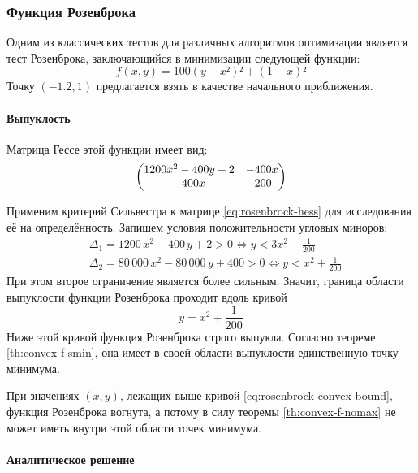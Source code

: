 \subsubsection{Функция Розенброка}

Одним из классических тестов для различных алгоритмов оптимизации
является тест Розенброка, заключающийся в минимизации следующей
функции:
\begin{equation}
  \label{eq:rosenbrock}
  \tag{$\rho$-\theequation}
  f(x, y) = 100(y - x²)² + (1 - x)²
\end{equation}
Точку $(-1.2, 1)$ предлагается взять в качестве начального
приближения.

\paragraph{Выпуклость}

Матрица Гессе этой функции имеет вид:
\begin{equation}
  \label{eq:rosenbrock-hess}
  \begin{pmatrix}
    1200x^2-400y+2 & -400x \\
    -400x & \phm200\phantom{x}
  \end{pmatrix}
\end{equation}

Применим критерий Сильвестра к матрице \eqref{eq:rosenbrock-hess} для
исследования её на определённость. Запишем условия положительности
угловых миноров:
\begin{align*}
  &\Delta_1 = 1200\,x^2-400\,y+2 > 0 \iff y < 3x^2+\frac{1}{200}\\
  &\Delta_2 = 80\,000\,x^2-80\,000\,y+400 > 0 \iff y < x^2+\frac{1}{200}
\end{align*}
При этом второе ограничение является более сильным. Значит, граница
области выпуклости функции Розенброка проходит вдоль кривой
\begin{equation}
  \label{eq:rosenbrock-convex-bound}
  y = x^2 +\frac{1}{200}
\end{equation}
Ниже этой кривой функция Розенброка строго выпукла. Согласно теореме
\ref{th:convex-f-smin}, она имеет в своей области выпуклости
единственную точку минимума.

При значениях $(x, y)$, лежащих выше кривой
\eqref{eq:rosenbrock-convex-bound}, функция Розенброка вогнута, а
потому в силу теоремы \ref{th:convex-f-nomax} не может иметь внутри
этой области точек минимума.

\paragraph{Аналитическое решение}

